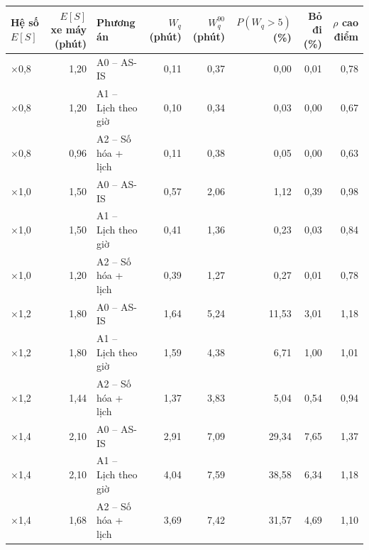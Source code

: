 \begin{tabular}{lrlrrrrr}
\toprule
\textbf{Hệ số $E[S]$} & \textbf{$E[S]$ xe máy (phút)} & \textbf{Phương án} & \textbf{$W_q$ (phút)} & \textbf{$W_q^{90}$ (phút)} & \textbf{$P(W_q{>}5)$ (\%)} & \textbf{Bỏ đi (\%)} & \textbf{$\rho$ cao điểm} \\
\midrule
$\times$0{,}8 & 1{,}20 & A0 – AS-IS & 0{,}11 & 0{,}37 & 0{,}00 & 0{,}01 & 0{,}78 \\
$\times$0{,}8 & 1{,}20 & A1 – Lịch theo giờ & 0{,}10 & 0{,}34 & 0{,}03 & 0{,}00 & 0{,}67 \\
$\times$0{,}8 & 0{,}96 & A2 – Số hóa + lịch & 0{,}11 & 0{,}38 & 0{,}05 & 0{,}00 & 0{,}63 \\
$\times$1{,}0 & 1{,}50 & A0 – AS-IS & 0{,}57 & 2{,}06 & 1{,}12 & 0{,}39 & 0{,}98 \\
$\times$1{,}0 & 1{,}50 & A1 – Lịch theo giờ & 0{,}41 & 1{,}36 & 0{,}23 & 0{,}03 & 0{,}84 \\
$\times$1{,}0 & 1{,}20 & A2 – Số hóa + lịch & 0{,}39 & 1{,}27 & 0{,}27 & 0{,}01 & 0{,}78 \\
$\times$1{,}2 & 1{,}80 & A0 – AS-IS & 1{,}64 & 5{,}24 & 11{,}53 & 3{,}01 & 1{,}18 \\
$\times$1{,}2 & 1{,}80 & A1 – Lịch theo giờ & 1{,}59 & 4{,}38 & 6{,}71 & 1{,}00 & 1{,}01 \\
$\times$1{,}2 & 1{,}44 & A2 – Số hóa + lịch & 1{,}37 & 3{,}83 & 5{,}04 & 0{,}54 & 0{,}94 \\
$\times$1{,}4 & 2{,}10 & A0 – AS-IS & 2{,}91 & 7{,}09 & 29{,}34 & 7{,}65 & 1{,}37 \\
$\times$1{,}4 & 2{,}10 & A1 – Lịch theo giờ & 4{,}04 & 7{,}59 & 38{,}58 & 6{,}34 & 1{,}18 \\
$\times$1{,}4 & 1{,}68 & A2 – Số hóa + lịch & 3{,}69 & 7{,}42 & 31{,}57 & 4{,}69 & 1{,}10 \\
\bottomrule
\end{tabular}
